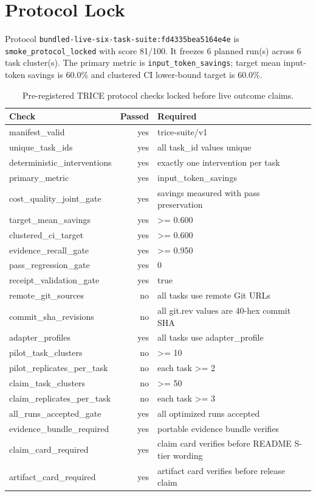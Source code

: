 \documentclass[10pt]{article}
\begin{document}
        \section{Protocol Lock}
Protocol \texttt{bundled-live-six-task-suite:fd4335bea5164e4e} is \texttt{smoke\_protocol\_locked} with score 81/100. It freezes 6 planned run(s) across 6 task cluster(s). The primary metric is \texttt{input\_token\_savings}; target mean input-token savings is 60.0\% and clustered CI lower-bound target is 60.0\%.

\begin{table}[h]
\centering
\begin{tabular}{lrl}
\toprule
Check & Passed & Required \\
\midrule
manifest\_valid & yes & trice-suite/v1 \\
unique\_task\_ids & yes & all task\_id values unique \\
deterministic\_interventions & yes & exactly one intervention per task \\
primary\_metric & yes & input\_token\_savings \\
cost\_quality\_joint\_gate & yes & savings measured with pass preservation \\
target\_mean\_savings & yes & >= 0.600 \\
clustered\_ci\_target & yes & >= 0.600 \\
evidence\_recall\_gate & yes & >= 0.950 \\
pass\_regression\_gate & yes & 0 \\
receipt\_validation\_gate & yes & true \\
remote\_git\_sources & no & all tasks use remote Git URLs \\
commit\_sha\_revisions & no & all git.rev values are 40-hex commit SHA \\
adapter\_profiles & yes & all tasks use adapter\_profile \\
pilot\_task\_clusters & no & >= 10 \\
pilot\_replicates\_per\_task & no & each task >= 2 \\
claim\_task\_clusters & no & >= 50 \\
claim\_replicates\_per\_task & no & each task >= 3 \\
all\_runs\_accepted\_gate & yes & all optimized runs accepted \\
evidence\_bundle\_required & yes & portable evidence bundle verifies \\
claim\_card\_required & yes & claim card verifies before README S-tier wording \\
artifact\_card\_required & yes & artifact card verifies before release claim \\
\bottomrule
\end{tabular}
\caption{Pre-registered TRICE protocol checks locked before live outcome claims.}
\end{table}
\end{document}
